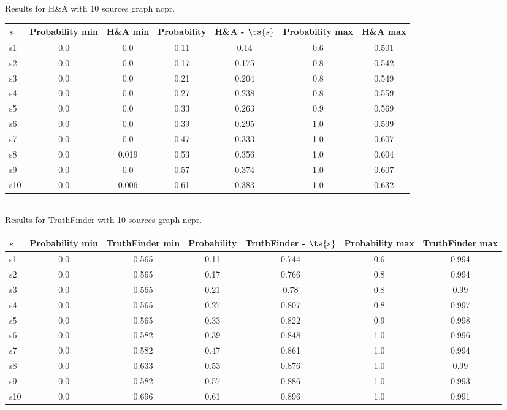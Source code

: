 \documentclass{article}
\begin{document}
\noindent Results for H\&A with 10 sources graph ncpr.

\noindent\begin{tabular}{|l|c|c|c|c|c|c|}
\hline
$s$& Probability min & H\&A min & Probability & H\&A - $\ts{s}$ & Probability max & H\&A max\\
\hline
s1 &0.0 & 0.0 & 0.11 & 0.14 & 0.6 & 0.501\\
\hline
s2 &0.0 & 0.0 & 0.17 & 0.175 & 0.8 & 0.542\\
\hline
s3 &0.0 & 0.0 & 0.21 & 0.204 & 0.8 & 0.549\\
\hline
s4 &0.0 & 0.0 & 0.27 & 0.238 & 0.8 & 0.559\\
\hline
s5 &0.0 & 0.0 & 0.33 & 0.263 & 0.9 & 0.569\\
\hline
s6 &0.0 & 0.0 & 0.39 & 0.295 & 1.0 & 0.599\\
\hline
s7 &0.0 & 0.0 & 0.47 & 0.333 & 1.0 & 0.607\\
\hline
s8 &0.0 & 0.019 & 0.53 & 0.356 & 1.0 & 0.604\\
\hline
s9 &0.0 & 0.0 & 0.57 & 0.374 & 1.0 & 0.607\\
\hline
s10 &0.0 & 0.006 & 0.61 & 0.383 & 1.0 & 0.632\\
\hline
\end{tabular}\\

\noindent Results for TruthFinder with 10 sources graph ncpr.

\noindent\begin{tabular}{|l|c|c|c|c|c|c|}
\hline
$s$& Probability min & TruthFinder min & Probability & TruthFinder - $\ts{s}$ & Probability max & TruthFinder max\\
\hline
s1 &0.0 & 0.565 & 0.11 & 0.744 & 0.6 & 0.994\\
\hline
s2 &0.0 & 0.565 & 0.17 & 0.766 & 0.8 & 0.994\\
\hline
s3 &0.0 & 0.565 & 0.21 & 0.78 & 0.8 & 0.99\\
\hline
s4 &0.0 & 0.565 & 0.27 & 0.807 & 0.8 & 0.997\\
\hline
s5 &0.0 & 0.565 & 0.33 & 0.822 & 0.9 & 0.998\\
\hline
s6 &0.0 & 0.582 & 0.39 & 0.848 & 1.0 & 0.996\\
\hline
s7 &0.0 & 0.582 & 0.47 & 0.861 & 1.0 & 0.994\\
\hline
s8 &0.0 & 0.633 & 0.53 & 0.876 & 1.0 & 0.99\\
\hline
s9 &0.0 & 0.582 & 0.57 & 0.886 & 1.0 & 0.993\\
\hline
s10 &0.0 & 0.696 & 0.61 & 0.896 & 1.0 & 0.991\\
\hline
\end{tabular}\\
\end{document}
